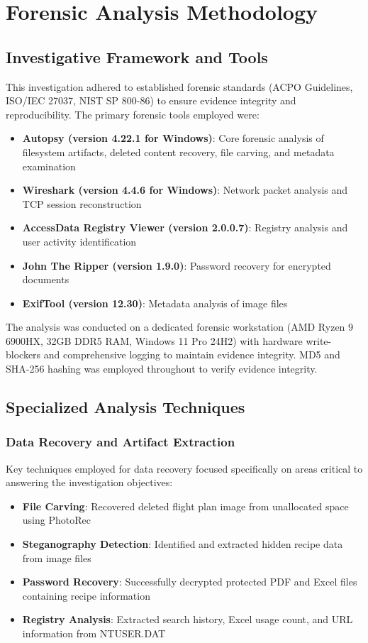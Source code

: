 \chapter{Forensic Analysis Methodology}

\section{Investigative Framework and Tools}
This investigation adhered to established forensic standards (ACPO Guidelines, ISO/IEC 27037, NIST SP 800-86) to ensure evidence integrity and reproducibility. The primary forensic tools employed were:

\begin{itemize}
    \item \textbf{Autopsy (version 4.22.1 for Windows)}: Core forensic analysis of filesystem artifacts, deleted content recovery, file carving, and metadata examination
    \item \textbf{Wireshark (version 4.4.6 for Windows)}: Network packet analysis and TCP session reconstruction
    \item \textbf{AccessData Registry Viewer (version 2.0.0.7)}: Registry analysis and user activity identification
    \item \textbf{John The Ripper (version 1.9.0)}: Password recovery for encrypted documents
    \item \textbf{ExifTool (version 12.30)}: Metadata analysis of image files
\end{itemize}

The analysis was conducted on a dedicated forensic workstation (AMD Ryzen 9 6900HX, 32GB DDR5 RAM, Windows 11 Pro 24H2) with hardware write-blockers and comprehensive logging to maintain evidence integrity. MD5 and SHA-256 hashing was employed throughout to verify evidence integrity.

\section{Specialized Analysis Techniques}

\subsection{Data Recovery and Artifact Extraction}
Key techniques employed for data recovery focused specifically on areas critical to answering the investigation objectives:

\begin{itemize}
    \item \textbf{File Carving}: Recovered deleted flight plan image from unallocated space using PhotoRec
    \item \textbf{Steganography Detection}: Identified and extracted hidden recipe data from image files
    \item \textbf{Password Recovery}: Successfully decrypted protected PDF and Excel files containing recipe information
    \item \textbf{Registry Analysis}: Extracted search history, Excel usage count, and URL information from NTUSER.DAT
\end{itemize}

